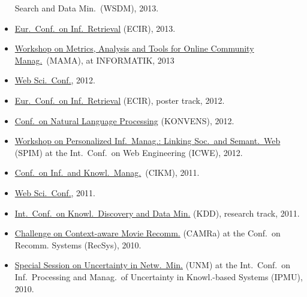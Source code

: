 \documentclass[line,margin]{res}
\newcounter{x}
\begin{document}
\begin{resume}
\begin{itemize}
  Search and Data Min.\ (WSDM), 2013.  
\item \href{http://ecir2013.org/}{Eur.\ Conf.\ on Inf.\ Retrieval} (ECIR), 2013.  
\item \href{http://mama.west.uni-koblenz.de/}{Workshop on Metrics,
  Analysis and Tools for Online Community Manag.}\ (MAMA), at
  INFORMATIK, 2013
\item \href{http://www.websci12.org/}{Web Sci.\ Conf.}, 2012. 
\item \href{http://ecir2012.upf.edu/}{Eur.\ Conf.\ on Inf.\ Retrieval} (ECIR), poster track, 2012.  
\item \href{http://www.oegai.at/konvens2012/}{Conf.\ on Natural Language
  Processing} (KONVENS), 2012. 
\item \href{http://spim-workshop.org/}{Workshop on Personalized
  Inf.\ Manag.: Linking Soc.\ and Semant.\ Web} (SPIM) at the
  Int.\ Conf.\ on Web Engineering (ICWE), 2012. 
\item \href{http://www.cikm2011.org/}{Conf.\ on Inf.\ and Knowl.\ Manag.}\ (CIKM), 2011.
\item \href{http://www.websci11.org/}{Web Sci.\ Conf.}, 2011.
\item \href{http://www.sigkdd.org/kdd/2011/}{Int.\ Conf.\ on 
  Knowl.\ Discovery and Data Min.} (KDD), research track, 2011.
\item \href{http://www.dai-labor.de/camra2010/}{Challenge on
  Context-aware Movie Recomm.} (CAMRa) at the Conf.\ on  
  Recomm. Systems (RecSys), 2010.   
\item \href{http://www.dai-labor.de/unm2010/}{Special Session on Uncertainty in Netw.\ Min.} (UNM) at the
  Int.\ Conf.\ on Inf.\ Processing and Manag.\ of
  Uncertainty in Knowl.-based Systems (IPMU), 2010. 
\end{itemize}


\end{resume}
\end{document}
